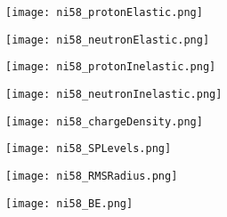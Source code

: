 \documentclass[twocolumn,secnumarabic,amssymb, nobibnotes, aps, prl,
superscriptaddress, nobalancelastpage, floatfix]{revtex4}
\newcommand{\niEight}{\ensuremath{^{58}}N\lowercase{i}}
\begin{document}
{\begin{figure*}[!htb]
    \centering
    \begin{minipage}{0.4\linewidth}
        \centering
        \texttt{[image: ni58\_protonElastic.png]}
        \label{DOM_ni58_proton_elastic}
    \end{minipage}\hspace{6pt}
    \begin{minipage}{0.4\linewidth}
        \centering
        \texttt{[image: ni58\_neutronElastic.png]}
        \label{DOM_ni58_neutron_elastic}
    \end{minipage}
    \centering
    \begin{minipage}{0.4\linewidth}
        \centering
        \texttt{[image: ni58\_protonInelastic.png]}
        \label{DOM_ni58_proton_inelastic}
    \end{minipage}\hspace{6pt}
    \begin{minipage}{0.4\linewidth}
        \centering
        \texttt{[image: ni58\_neutronInelastic.png]}
        \label{DOM_ni58_neutron_inelastic}
    \end{minipage}
    \centering
    \begin{minipage}{0.4\linewidth}
        \centering
        \texttt{[image: ni58\_chargeDensity.png]}
        \label{DOM_ni58_chargeDensity}
    \end{minipage}\hspace{6pt}
    \begin{minipage}{0.4\linewidth}
        \centering
        \texttt{[image: ni58\_SPLevels.png]}
        \label{DOM_ni58_SPLevels}
    \end{minipage}
    \begin{minipage}{0.4\linewidth}
        \centering
        \texttt{[image: ni58\_RMSRadius.png]}
        \label{DOM_ni58_RMSRadius}
    \end{minipage}\hspace{6pt}
    \begin{minipage}{0.4\linewidth}
        \centering
        \texttt{[image: ni58\_BE.png]}
        \label{DOM_ni58_BE}
    \end{minipage}
    \caption{\niEight: constraining experimental data and DOM fit. See introduction of
    Appendix C for description.}
    \label{DOM_ni58}
\end{figure*}

}
\end{document}
